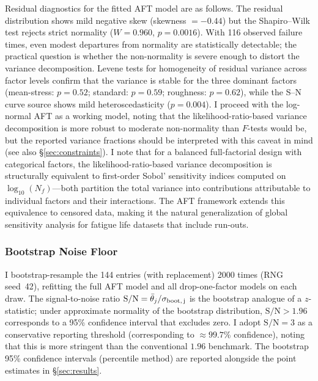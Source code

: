 \documentclass[12pt,a4paper]{article}
\begin{document}
Residual diagnostics for the fitted AFT model are as follows.
The residual distribution shows mild negative skew (skewness
$=-0.44$) but the Shapiro--Wilk test rejects strict normality
($W=0.960$, $p=0.0016$). With 116 observed failure times, even
modest departures from normality are statistically detectable;
the practical question is whether the non-normality is severe
enough to distort the variance decomposition. Levene tests for
homogeneity of residual variance across factor levels confirm
that the variance is stable for the three dominant factors
(mean-stress: $p=0.52$; standard: $p=0.59$; roughness:
$p=0.62$), while the S--N curve source shows mild
heteroscedasticity ($p=0.004$). I proceed with the log-normal
AFT as a working model, noting that the likelihood-ratio-based
variance decomposition is more robust to moderate non-normality
than $F$-tests would be, but the reported variance fractions
should be interpreted with this caveat in mind (see also
\S\ref{sec:constraints}). I note that for a balanced full-factorial
design with categorical factors, the likelihood-ratio-based variance
decomposition is structurally equivalent to first-order Sobol'
sensitivity indices computed on $\log_{10}(N_f)$---both partition the
total variance into contributions attributable to individual factors
and their interactions. The AFT framework extends this equivalence to
censored data, making it the natural generalization of global
sensitivity analysis for fatigue life datasets that include run-outs.

\subsubsection{Bootstrap Noise Floor}

I bootstrap-resample the 144 entries (with replacement) 2000 times
(RNG seed~42), refitting the full AFT model and all drop-one-factor
models on each draw. The signal-to-noise ratio
$\mathrm{S/N} = \bar{\theta}_j / \sigma_{\rm boot,\,j}$ is the
bootstrap analogue of a $z$-statistic; under approximate normality
of the bootstrap distribution, $\mathrm{S/N} > 1.96$ corresponds to
a 95\% confidence interval that excludes zero. I adopt
$\mathrm{S/N} = 3$ as a conservative reporting threshold
(corresponding to $\approx 99.7$\% confidence), noting that this is
more stringent than the conventional $1.96$ benchmark. The bootstrap
95\% confidence intervals (percentile method) are reported alongside
the point estimates in \S\ref{sec:results}.

\end{document}
